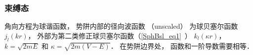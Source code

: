 
\begin{issues}
\issueDraft
\end{issues}


\subsubsection{束缚态}

角向方程为球谐函数， 势阱内部的径向波函数 （unscaled） 为球贝塞尔函数 $j_l(kr)$，  外部为第二类修正球贝塞尔函数（\autoref{SphBsl_eq1}~） $k_l(\kappa r)$，   $k = \sqrt{2mE}$ 和 $\kappa = \sqrt{2m(V - E)}$． 在势阱边界处， 函数和一阶导数需要相等． 
